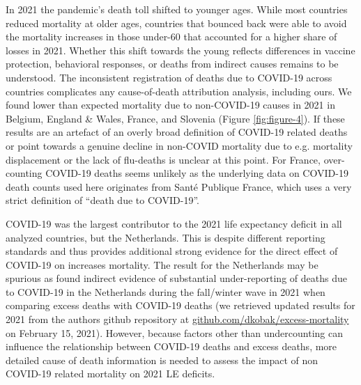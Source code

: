 \documentclass[12pt]{article}
\begin{document}
In 2021 the pandemic's death toll shifted to younger ages. While most countries reduced mortality at older ages, countries that bounced back were able to  avoid the mortality increases in those under-60 that accounted for a higher share of losses in 2021. Whether this shift towards the young reflects differences in vaccine protection, behavioral responses, or deaths from indirect causes remains to be understood. The inconsistent registration of deaths due to COVID-19 across countries\citealp{Garcia2021} complicates any cause-of-death attribution analysis, including ours. We found lower than expected mortality due to non-COVID-19 causes in 2021 in Belgium, England \& Wales, France, and Slovenia (Figure \ref{fig:figure-4}). If these results are an artefact of an overly broad definition of COVID-19 related deaths or point towards a genuine decline in non-COVID mortality due to e.g. mortality displacement or the lack of flu-deaths is unclear at this point. For France, over-counting COVID-19 deaths seems unlikely as the underlying data on COVID-19 death counts used here originates from Santé Publique France, which uses a very strict definition of ``death due to COVID-19''.\citealp{Garcia2021}

COVID-19 was the largest contributor to the 2021 life expectancy deficit in all analyzed countries, but the Netherlands. This is despite different reporting standards and thus provides additional strong evidence for the direct effect of COVID-19 on increases mortality. The result for the Netherlands may be spurious as \citeauthor{Karlinsky2021}\citealp{Karlinsky2021} found indirect evidence of substantial under-reporting of deaths due to COVID-19 in the Netherlands during the fall/winter wave in 2021 when comparing excess deaths with COVID-19 deaths (we retrieved updated results for 2021 from the authors github repository at \href{https://github.com/dkobak/excess-mortality}{github.com/dkobak/excess-mortality} on February 15, 2021). However, because factors other than undercounting can influence the relationship between COVID-19 deaths and excess deaths, more detailed cause of death information is needed to assess the impact of non COVID-19 related mortality on 2021 LE deficits.
\end{document}
